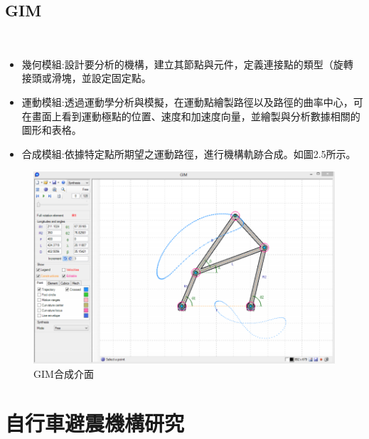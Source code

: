 \documentclass[14pt,a4paper]{report}  %
\newcommand{\fourteen}{\fontsize{14pt}{\baselineskip}\selectfont}%
\begin{document}
       \subsection{GIM}
       	\hspace*{\fill} \\        
        \fourteen {GIM是COMPMECH Research Group創建的註冊免費軟件，用於平面機構的運動模擬合成以及機械結構的靜態分析。GIM軟件具有三個主要模組：幾何、運動、合成。}
        \begin{itemize} 
       \item 幾何模組:設計要分析的機構，建立其節點與元件，定義連接點的類型（旋轉
接頭或滑塊，並設定固定點。
       \item 運動模組:透過運動學分析與模擬，在運動點繪製路徑以及路徑的曲率中心，可在畫面上看到運動極點的位置、速度和加速度向量，並繪製與分析數據相關的圖形和表格。
       \item 合成模組:依據特定點所期望之運動路徑，進行機構軌跡合成。如圖2.5所示。
       \end{itemize}
        \begin{figure}[H]
        \centering
        \includegraphics[scale=0.8]{GIM.png} 
        \caption{GIM合成介面} 
        \label{fig:scale}
    	\end{figure}
      \newpage
      \section{自行車避震機構研究}
\end{document}
